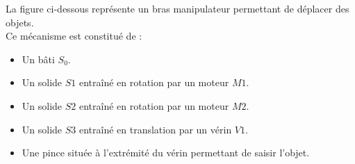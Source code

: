 La figure ci-dessous représente un bras manipulateur permettant de déplacer des objets.\\
Ce mécanisme est constitué de :

\begin{itemize}
\item Un bâti $S_0$.
\item Un solide $S1$ entraîné en rotation par un moteur $M1$.
\item Un solide $S2$ entraîné en rotation par un moteur $M2$.
\item Un solide $S3$ entraîné en translation par un vérin $V1$.
\item Une pince située à l’extrémité du vérin permettant de saisir l’objet.
\end{itemize}

